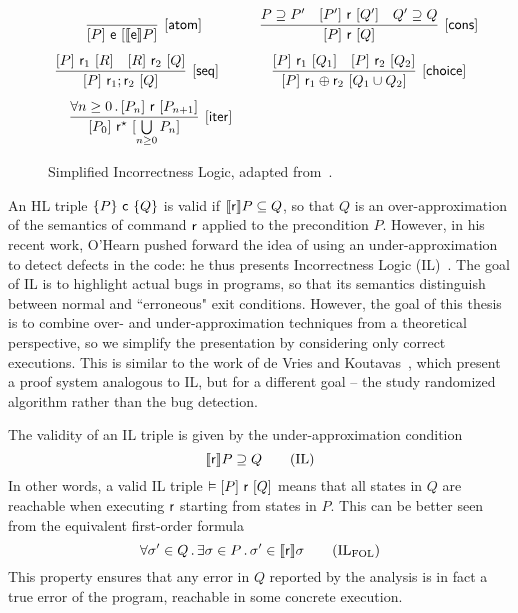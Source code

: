 \begin{figure}[t]
	\centering
	\begin{framed}
		\(
		\begin{array}{cc}
			\infer[\ilrule{atom}]
			{\iltriple{P}{\expe}{\denot{\expe}P}}
			{}
			\quad                       &
			\infer[\ilrule{cons}]
			{\iltriple{P}{\regr}{Q}}
			{P \supseteq P'             & \iltriple{P'}{\regr}{Q'}    & Q' \supseteq Q}
			\\[7.5pt]
			\infer[\ilrule{seq}]
			{\iltriple{P}{\regr_1;\regr_2}{Q}}
			{\iltriple{P}{\regr_1}{R}   & \iltriple{R}{\regr_2}{Q}}
			\qquad                      &
			\infer[\ilrule{choice}]
			{\iltriple{P}{\regr_1 \regplus \regr_2}{Q_1 \cup Q_2}}
			{\iltriple{P}{\regr_1}{Q_1} & \iltriple{P}{\regr_2}{Q_2}}
			\\[7.5pt]
			\infer[\ilrule{iter}]
			{\iltriple{P_0}{\regr^\kstar}{\bigcup\limits_{n \ge 0} P_n}}
			{\forall n \ge 0 \sdot \iltriple{P_n}{\regr}{P_{n+1}}}
		\end{array}
		\)
	\end{framed}
	\vspace{-1ex}
	\caption{Simplified Incorrectness Logic, adapted from~\cite{MOH21}.}
	\label{fig:bg:il}
\end{figure}

An HL triple $\{P\}~\mathsf{c}~\{Q\}$ is valid if $\llbracket\mathsf{r}\rrbracket P \subseteq Q$, so that $Q$ is an over-approximation of the semantics of command $\mathsf{r}$ applied to the precondition $P$. However, in his recent work, O'Hearn pushed forward the idea of using an under-approximation to detect defects in the code: he thus presents Incorrectness Logic (IL)~\cite{OHearn20}.
The goal of IL is to highlight actual bugs in programs, so that its semantics distinguish between normal and ``erroneous" exit conditions. However, the goal of this thesis is to combine over- and under-approximation techniques from a theoretical perspective, so we simplify the presentation by considering only correct executions. This is similar to the work of de Vries and Koutavas~\cite{VK11}, which present a proof system analogous to IL, but for a different goal -- the study randomized algorithm rather than the bug detection.

The validity of an IL triple is given by the under-approximation condition
\[
\llbracket\mathsf{r}\rrbracket P \supseteq Q \tag{IL}\label{eq:bg:il-validity}
\]
In other words, a valid IL triple $\vDash [P]~\mathsf{r}~[Q]$ means that all states in $Q$ are reachable when executing $\mathsf{r}$ starting from states in $P$. This can be better seen from the equivalent first-order formula
\[
\forall \sigma' \in Q \sdot \exists \sigma \in P \sdot \sigma' \in \fwsem{\regr} \sigma \tag{IL$_{\text{FOL}}$}\label{eq:bg:il-fol}
\]
This property ensures that any error in $Q$ reported by the analysis is in fact a true error of the program, reachable in some concrete execution.

